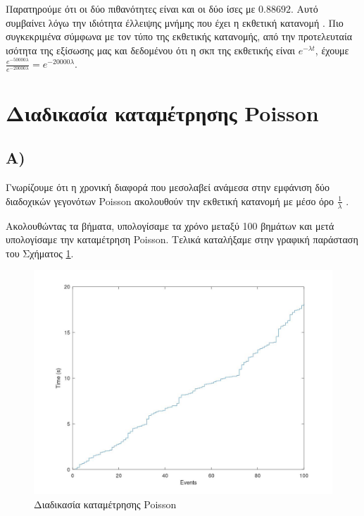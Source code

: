 \documentclass{article}
\newcommand{\english}[1]{\foreignlanguage{english}{{#1}}}
\begin{document}
Παρατηρούμε ότι οι δύο πιθανότητες είναι και οι δύο ίσες με $0.88692$. Αυτό συμβαίνει λόγω την ιδιότητα έλλειψης μνήμης που έχει η εκθετική κατανομή \cite{exponential_distribution}. Πιο συγκεκριμένα σύμφωνα με τον τύπο της εκθετικής κατανομής, από την προτελευταία ισότητα της εξίσωσης μας και δεδομένου ότι η σκπ της εκθετικής είναι $e^{-λt}$, έχουμε $\frac{e^{-50000λ}}{e^{-20000λ}} = e^{{-20000λ}}$.

\section*{Διαδικασία καταμέτρησης \english{Poisson}}

\subsection*{Α)}

Γνωρίζουμε ότι η χρονική διαφορά που μεσολαβεί ανάμεσα στην εμφάνιση δύο διαδοχικών γεγονότων \english{Poisson} ακολουθούν την εκθετική κατανομή με μέσο όρο $\frac{1}{λ}$ \cite{stackexchange}. 

Ακολουθώντας τα βήματα, υπολογίσαμε τα χρόνο μεταξύ 100 βημάτων και μετά υπολογίσαμε την καταμέτρηση \english{Poisson}. Τελικά καταλήξαμε στην γραφική παράσταση του Σχήματος \ref{fig:poisson_counting}.

\begin{figure}
    \centering
    \includegraphics[width=\textwidth]{poisson_counting.jpg}
    \caption{Διαδικασία καταμέτρησης \english{Poisson}}
    \label{fig:poisson_counting}
\end{figure}
\end{document}
